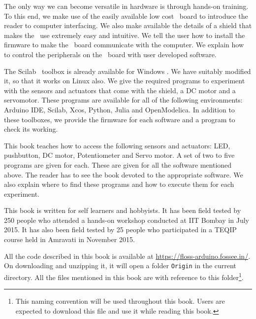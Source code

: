 The only way we can become versatile in hardware is through hands-on
training.  To this end, we make use of the easily available low cost
\arduino\ board to introduce the reader to computer interfacing.  We
also make available the details of a shield that makes the
\arduino\ use extremely easy and intuitive.  We tell the user how to
install the firmware to make the \arduino\ board communicate with the
computer.  We explain how to control the peripherals on the
\arduino\ board with user developed software.

The Scilab \arduino\ toolbox is already available for Windows
\cite{scilab-arduino}.  We have suitably modified it, so that it works
on Linux also.  We give the required programs to experiment with the
sensors and actuators that come with the shield, a DC motor and a
servomotor.  These programs are available for all of the following
environments: Arduino IDE, Scilab, Xcos, Python, Julia and
OpenModelica.  In addition to these toolboxes, we provide the firmware
for each software and a program to check its working.

This book teaches how to access the following sensors and actuators:
LED, pushbutton, DC motor, Potentiometer and Servo motor.  A set of
two to five programs are given for each.  These are given for all the
software mentioned above.  The reader has to see the book devoted to
the appropriate software.  We also explain where to find these
programs and how to execute them for each experiment.

This book is written for self learners and hobbyists.  It has been
field tested by 250 people who attended a hands-on workshop conducted
at IIT Bombay in July 2015.  It has also been field tested by 25
people who participated in a TEQIP course held in Amravati in November
2015.  

All the code described in this book is available at
\url{https://floss-arduino.fossee.in/}.  On
downloading and unzipping it, it will open a folder {\tt Origin} in
the current directory.  All the files mentioned in this book are
with reference to this folder\footnote{\label{fn:file-loc}This naming
  convention will be used throughout this book.  Users are expected to
  download this file and use it while reading this book.}.
